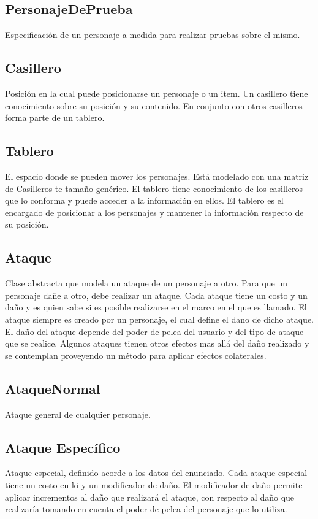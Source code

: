 \documentclass[a4paper]{article}
\begin{document}
\subsection{PersonajeDePrueba}
Especificación de un personaje a medida para realizar pruebas sobre el mismo.

\subsection{Casillero}
Posición en la cual puede posicionarse un personaje o un item. Un casillero tiene conocimiento sobre su posición y su contenido. En conjunto con otros casilleros forma parte de un tablero.

\subsection{Tablero} El espacio donde se pueden mover los personajes. Está modelado con una matriz de Casilleros te tamaño genérico. El tablero tiene conocimiento de los casilleros que lo conforma y puede acceder a la información en ellos. El tablero es el encargado de posicionar a los personajes y mantener la información respecto de su posición.

\subsection{Ataque}
Clase abstracta que modela un ataque de un personaje a otro. Para que un personaje dañe a otro, debe realizar un ataque. Cada ataque tiene un costo y un daño y es quien sabe si es posible realizarse en el marco en el que es llamado. El ataque siempre es creado por un personaje, el cual define el dano de dicho ataque. El daño del ataque depende del poder de pelea del usuario y del tipo de ataque que se realice. Algunos ataques tienen otros efectos mas allá del daño realizado y se contemplan proveyendo un método para aplicar efectos colaterales.

\subsection{AtaqueNormal}
Ataque general de cualquier personaje.

\subsection{Ataque Específico}
Ataque especial, definido acorde a los datos del enunciado. Cada ataque especial tiene un costo en ki y un modificador de daño. El modificador de daño permite aplicar incrementos al daño que realizará el ataque, con respecto al daño que realizaría tomando en cuenta el poder de pelea del personaje que lo utiliza. 
\end{document}
